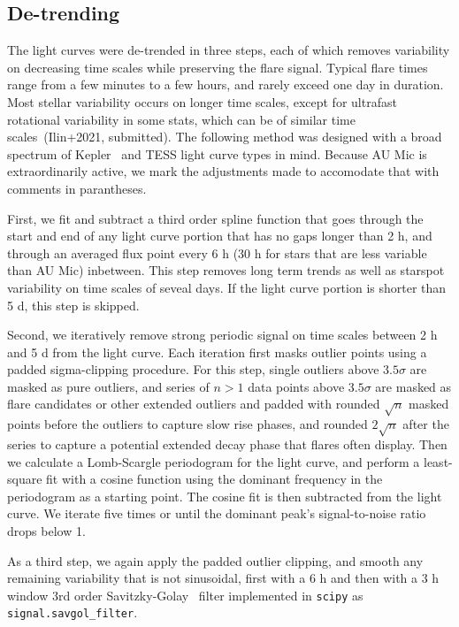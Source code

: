 \documentclass[fleqn,usenatbib,letters]{mnras}%
\begin{document}
\subsection{De-trending}
\label{sec:detrend}
The light curves were de-trended in three steps, each of which removes variability on decreasing time scales while preserving the flare signal. Typical flare times range from a few minutes to a few hours, and rarely exceed one day in duration. Most stellar variability occurs on longer time scales, except for ultrafast rotational variability in some stats, which can be of similar time scales~(Ilin+2021, submitted). The following method was designed with a broad spectrum of Kepler~\citep{borucki2010} and TESS light curve types in mind. Because AU Mic is extraordinarily active, we mark the adjustments made to accomodate that with comments in parantheses. 

First, we fit and subtract a third order spline function that goes through the start and end of any light curve portion that has no gaps longer than 2 h, and through an averaged flux point every 6 h (30 h for stars that are less variable than AU Mic) inbetween. This step removes long term trends as well as starspot variability on time scales of seveal days. If the light curve portion is shorter than 5 d, this step is skipped. 

Second, we iteratively remove strong periodic signal on time scales between 2 h and 5 d from the light curve. Each iteration first masks outlier points using a padded sigma-clipping procedure. For this step, single outliers above $3.5 \sigma$ are masked as pure outliers, and series of $n>1$ data points above $3.5 \sigma$ are masked as flare candidates or other extended outliers and padded with rounded $\sqrt{n}$ masked points before the outliers to capture slow rise phases, and rounded $2\sqrt{n}$ after the series to capture a potential extended decay phase that flares often display. Then we calculate a Lomb-Scargle periodogram for the light curve, and perform a least-square fit with a cosine function using the dominant frequency in the periodogram as a starting point. The cosine fit is then subtracted from the light curve. We iterate five times or until the dominant peak's signal-to-noise ratio drops below 1. 

As a third step, we again apply the padded outlier clipping, and smooth any remaining variability that is not sinusoidal, first with a 6 h and then with a 3 h window 3rd order Savitzky-Golay~\citep{savitzky1964} filter implemented in \texttt{scipy} as \texttt{signal.savgol\_filter}.
\end{document}
